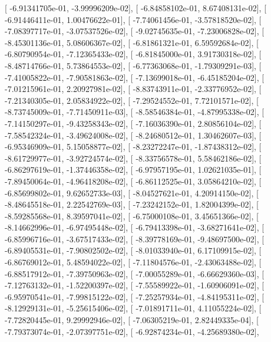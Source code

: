 \documentclass{article}
\begin{document}
       [ -6.91341705e-01,  -3.99996209e-02],
       [ -6.84858102e-01,   8.67408131e-02],
       [ -6.91446411e-01,   1.00476622e-01],
       [ -7.74061456e-01,  -3.57818520e-02],
       [ -7.08397717e-01,  -3.07537526e-02],
       [ -9.02745635e-01,  -7.23006828e-02],
       [ -8.45301136e-01,   5.08606367e-02],
       [ -6.81861321e-01,   6.59592684e-02],
       [ -6.80790954e-01,  -7.12365433e-02],
       [ -6.81845000e-01,   3.91730318e-02],
       [ -8.48714766e-01,   5.73864553e-02],
       [ -6.77363068e-01,  -1.79309291e-03],
       [ -7.41005822e-01,  -7.90581863e-02],
       [ -7.13699018e-01,  -6.45185204e-02],
       [ -7.01215961e-01,   2.20927981e-02],
       [ -8.83743911e-01,  -2.33776952e-02],
       [ -7.21340305e-01,   2.05834922e-02],
       [ -7.29524552e-01,   7.72101571e-02],
       [ -8.73745009e-01,  -7.71450911e-03],
       [ -8.58546384e-01,  -4.87995338e-02],
       [ -7.14150297e-01,  -9.43258343e-02],
       [ -7.16036390e-01,   2.80856104e-02],
       [ -7.58542324e-01,  -3.49624008e-02],
       [ -8.24680512e-01,   1.30462607e-03],
       [ -6.95346909e-01,   5.15058877e-02],
       [ -8.23272247e-01,  -1.87438312e-02],
       [ -8.61729977e-01,  -3.92724574e-02],
       [ -8.33756578e-01,   5.58462186e-02],
       [ -6.86297619e-01,  -1.37446358e-02],
       [ -6.97957195e-01,   1.02621035e-01],
       [ -7.89450064e-01,  -4.96418208e-02],
       [ -6.86112525e-01,   3.05864210e-02],
       [ -6.85699802e-01,   9.62652733e-03],
       [ -8.04527621e-01,   4.20914150e-02],
       [ -8.48645518e-01,   2.22542769e-03],
       [ -7.23242152e-01,   1.82004399e-02],
       [ -8.59285568e-01,   8.39597041e-02],
       [ -6.75000108e-01,   3.45651366e-02],
       [ -8.14662996e-01,  -6.97495448e-02],
       [ -6.79413398e-01,  -3.68271641e-02],
       [ -6.85996716e-01,  -3.67517433e-02],
       [ -8.39778169e-01,  -9.48697500e-02],
       [ -6.89405531e-01,  -7.90802502e-02],
       [ -8.01033940e-01,   6.17109915e-02],
       [ -6.86769012e-01,   5.48594022e-02],
       [ -7.11804576e-01,  -2.43063488e-02],
       [ -6.88517912e-01,  -7.39750963e-02],
       [ -7.00055289e-01,  -6.66629360e-03],
       [ -7.12763132e-01,  -1.52200397e-02],
       [ -7.55589922e-01,  -1.60906091e-02],
       [ -6.95970541e-01,  -7.99815122e-02],
       [ -7.25257934e-01,  -4.84195311e-02],
       [ -8.12929131e-01,  -5.25615406e-02],
       [ -7.01891711e-01,   4.11055224e-02],
       [ -7.72820445e-01,   9.29992946e-02],
       [ -7.06305219e-01,   2.82449335e-04],
       [ -7.79373074e-01,  -2.07397751e-02],
       [ -6.92874234e-01,  -4.25689380e-02],
\end{document}
